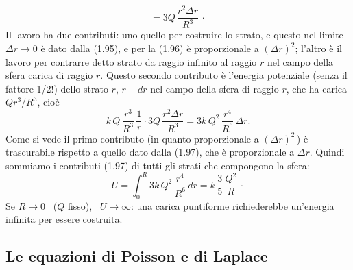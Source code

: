 \begin{enumerate}
\begin{equation}
      =3Q\,\frac{r^2\Delta r}{R^3}\,\cdot
      \tag{1.96}
    \end{equation}
    Il lavoro ha due contributi: uno quello per costruire lo strato, e questo
    nel limite $\Delta r\to0$ \`e dato dalla (1.95), e per la (1.96) \`e
    proporzionale a $(\Delta r)^2$; l'altro \`e il lavoro per contrarre detto
    strato da raggio infinito al raggio $r$ nel campo della sfera carica di
    raggio $r$. Questo secondo contributo \`e l'energia potenziale (senza il
    fattore 1/2!) dello strato $r$, $r+dr$ nel campo della sfera di raggio $r$,
    che ha carica $Qr^3/R^3$, cio\`e
    \begin{equation}
      k\,Q\,\frac{r^3}{R^3}\,\frac1r\cdot3Q\,\frac{r^2\Delta r}{R^3}
      =3k\,Q^2\,\frac{r^4}{R^6}\,\Delta r.
      \tag{1.97}
    \end{equation}
    Come si vede il primo contributo (in quanto proporzionale a
    $(\Delta r)^2$\,) \`e trascurabile rispetto a quello dato dalla (1.97), che
    \`e proporzionale a $\Delta r$. Quindi sommiamo i contributi (1.97) di tutti
    gli strati che compongono la sfera:
    \begin{equation}
      U=\int_0^R3k\,Q^2\,\frac{r^4}{R^6}\,dr=k\,\frac35\,\frac{Q^2}{R}\,\cdot
      \tag{1.98}
    \end{equation}
    Se $R\to0$ \ ($Q$ fisso), \ $U\to\infty$: una carica puntiforme
    richiederebbe un'energia infinita per essere costruita.
\end{enumerate}

\subsection{Le equazioni di Poisson e di Laplace}

